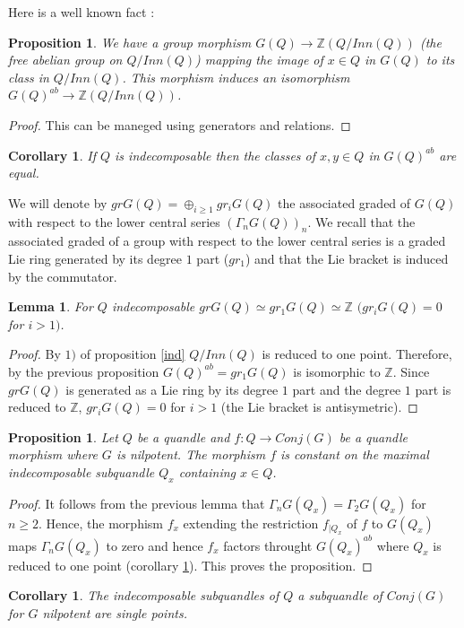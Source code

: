 \documentclass[12pt, reqno]{amsart}
\newtheorem{proposition}[theorem]{Proposition}
\newtheorem{corollary}[theorem]{Corollary}
\newtheorem{lemma}[theorem]{Lemma}
\newcommand{\Z}{ {\mathbb Z} }
\begin{document}
Here is a well known fact :
\begin{proposition}\label{abel}
We have a group morphism $G(Q) \to \Z (Q/Inn(Q))$ (the free abelian group on $Q/Inn(Q)$) mapping the image of $x\in Q$ in $G(Q)$ to its class in $Q/ Inn(Q)$. This morphism induces an isomorphism $G(Q)^{ab}\to \Z (Q/Inn(Q))$.
\end{proposition}
\begin{proof}
This can be maneged using generators and relations.
\end{proof}
\begin{corollary}\label{clas}
If $Q$ is indecomposable then the classes of $x,y\in Q$ in $G(Q)^{ab}$ are equal.
\end{corollary}
We will denote by $grG(Q)=\oplus_{i\geq1} gr_i G(Q)$ the associated graded of $G(Q)$ with respect to the lower central series $(\Gamma_n G(Q))_n$. We recall that the associated graded of a group  with respect to the lower central series is a graded Lie ring generated by its degree $1$ part ($gr_1$) and that the Lie bracket is induced by the commutator.
\begin{lemma}
For $Q$ indecomposable $grG(Q)\simeq gr_1 G(Q)\simeq \Z$ $($$gr_i G(Q)=0$ for $i>1$$)$.
\end{lemma}
\begin{proof}
By $1)$ of proposition \ref{ind} $Q/Inn(Q)$ is reduced to one point. Therefore, by the previous proposition $G(Q)^{ab}=gr_1G(Q)$ is isomorphic to $\Z$. Since $grG(Q)$ is generated as a Lie ring by its degree $1$ part and the degree $1$ part is reduced to $\Z$, $gr_iG(Q)=0$ for $i>1$ (the Lie bracket is antisymetric). 
\end{proof}
\begin{proposition}
Let $Q$ be a quandle and $f:Q\to Conj(G)$ be a quandle morphism where $G$ is nilpotent. The morphism $f$ is constant on the maximal indecomposable subquandle $Q_x$ containing $x\in Q$.
\end{proposition}
\begin{proof}
It follows from the previous lemma that $\Gamma_n G(Q_x)=\Gamma_2 G(Q_x)$ for $n\geq 2$. Hence, the morphism $f_x$ extending the restriction $f_{\vert Q_x}$ of $f$ to $G(Q_x)$ maps $\Gamma_n G(Q_x)$ to zero and hence $f_x$ factors throught $G(Q_x)^{ab}$ where $Q_x$ is reduced to one point (corollary \ref{clas}). This proves the proposition.
\end{proof}
\begin{corollary}
The indecomposable subquandles of $Q$ a subquandle of $Conj(G)$ for $G$ nilpotent are single points.
\end{corollary}
\end{document}
